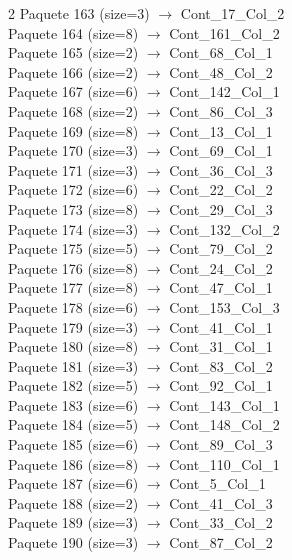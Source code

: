 \begin{multicols}{2}
Paquete 163 (size=3) $\rightarrow$ Cont\_17\_Col\_2\\
Paquete 164 (size=8) $\rightarrow$ Cont\_161\_Col\_2\\
Paquete 165 (size=2) $\rightarrow$ Cont\_68\_Col\_1\\
Paquete 166 (size=2) $\rightarrow$ Cont\_48\_Col\_2\\
Paquete 167 (size=6) $\rightarrow$ Cont\_142\_Col\_1\\
Paquete 168 (size=2) $\rightarrow$ Cont\_86\_Col\_3\\
Paquete 169 (size=8) $\rightarrow$ Cont\_13\_Col\_1\\
Paquete 170 (size=3) $\rightarrow$ Cont\_69\_Col\_1\\
Paquete 171 (size=3) $\rightarrow$ Cont\_36\_Col\_3\\
Paquete 172 (size=6) $\rightarrow$ Cont\_22\_Col\_2\\
Paquete 173 (size=8) $\rightarrow$ Cont\_29\_Col\_3\\
Paquete 174 (size=3) $\rightarrow$ Cont\_132\_Col\_2\\
Paquete 175 (size=5) $\rightarrow$ Cont\_79\_Col\_2\\
Paquete 176 (size=8) $\rightarrow$ Cont\_24\_Col\_2\\
Paquete 177 (size=8) $\rightarrow$ Cont\_47\_Col\_1\\
Paquete 178 (size=6) $\rightarrow$ Cont\_153\_Col\_3\\
Paquete 179 (size=3) $\rightarrow$ Cont\_41\_Col\_1\\
Paquete 180 (size=8) $\rightarrow$ Cont\_31\_Col\_1\\
Paquete 181 (size=3) $\rightarrow$ Cont\_83\_Col\_2\\
Paquete 182 (size=5) $\rightarrow$ Cont\_92\_Col\_1\\
Paquete 183 (size=6) $\rightarrow$ Cont\_143\_Col\_1\\
Paquete 184 (size=5) $\rightarrow$ Cont\_148\_Col\_2\\
Paquete 185 (size=6) $\rightarrow$ Cont\_89\_Col\_3\\
Paquete 186 (size=8) $\rightarrow$ Cont\_110\_Col\_1\\
Paquete 187 (size=6) $\rightarrow$ Cont\_5\_Col\_1\\
Paquete 188 (size=2) $\rightarrow$ Cont\_41\_Col\_3\\
Paquete 189 (size=3) $\rightarrow$ Cont\_33\_Col\_2\\
Paquete 190 (size=3) $\rightarrow$ Cont\_87\_Col\_2\\

\end{multicols}

